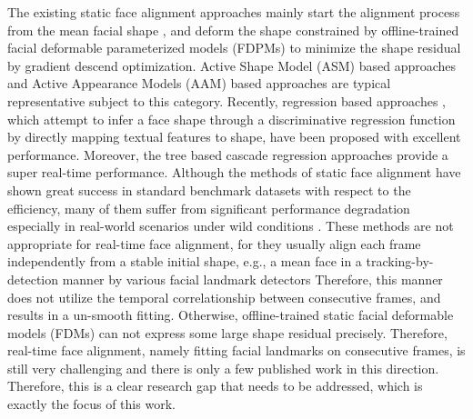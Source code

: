 \documentclass[a4paper, 10pt, conference]{ieeeconf}      %
\begin{document}
The existing static face alignment approaches mainly start the alignment process from the mean facial shape \cite{ren2014face}, and deform the shape constrained by 
offline-trained facial deformable parameterized models (FDPMs) to minimize the shape residual by gradient descend optimization. 
Active Shape Model (ASM) based approaches \cite{tecootes1994active} and Active Appearance Models (AAM) based approaches 
\cite{edwards1998interpreting,matthews2004active} are typical representative subject to this category. Recently, regression based approaches
\cite{valstar2010facial,dollar2010cascaded,cao2014face,xiong2013supervised,tzimiropoulos2015project}, which attempt to infer a face shape 
through a discriminative regression function by directly mapping textual features to shape, have been proposed with excellent performance.
Moreover, the tree based cascade regression approaches \cite{ren2014face,kazemi2014one,cao2014face,burgos2013robust} provide a super 
real-time performance.
Although the methods of static face alignment have shown great success in standard benchmark datasets \cite{sagonas2013300} with respect to
the efficiency,
many of them suffer from significant performance degradation especially in real-world scenarios under wild conditions
\cite{shen2015first,peng2016sequential}.
These methods are not appropriate for real-time face alignment, for
they usually align each frame independently from a stable initial shape, e.g., a mean face in a tracking-by-detection manner by various facial 
landmark detectors \cite{decarlo2000optical} Therefore, this manner does not utilize the temporal correlationship between consecutive frames,
and results in a un-smooth fitting. Otherwise, offline-trained static facial deformable models (FDMs) can not express some large shape residual precisely.
Therefore, real-time face alignment, namely fitting facial landmarks on
consecutive frames, is still very challenging and there is only a few published work in this direction. Therefore, this is a clear
research gap that needs to be addressed, which is exactly the focus of this work.
\end{document}
